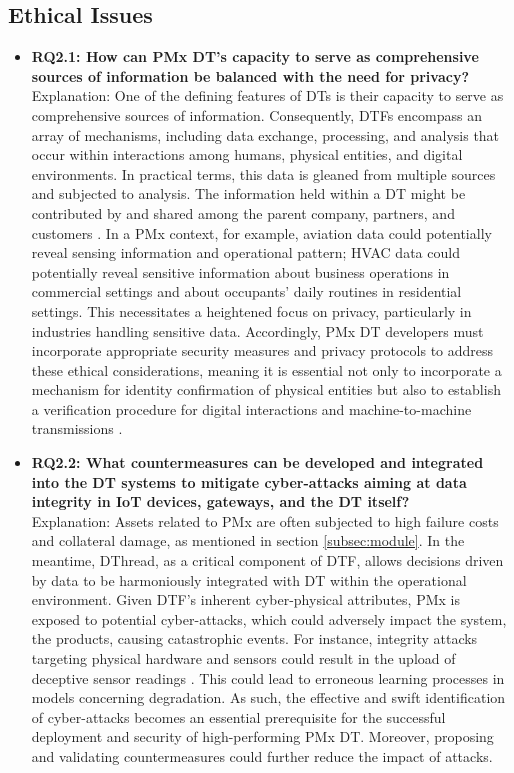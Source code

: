 \documentclass[runningheads]{llncs}
\begin{document}
\subsection{Ethical Issues} \label{Privary}
\begin{itemize}
\item \textbf{RQ2.1: How can PMx DT's capacity to serve as comprehensive sources of information be balanced with the need for privacy?} \\
Explanation: One of the defining features of DTs is their capacity to serve as comprehensive sources of information. Consequently, DTFs encompass an array of mechanisms, including data exchange, processing, and analysis that occur within interactions among humans, physical entities, and digital environments. In practical terms, this data is gleaned from multiple sources and subjected to analysis. The information held within a DT might be contributed by and shared among the parent company, partners, and customers \cite{moshrefzadeh2020towards}. In a PMx context, for example, aviation data could potentially reveal sensing information and operational pattern; HVAC data could potentially reveal sensitive information about business operations in commercial settings and about occupants' daily routines in residential settings. This necessitates a heightened focus on privacy, particularly in industries handling sensitive data. Accordingly, PMx DT developers must incorporate appropriate security measures and privacy protocols to address these ethical considerations, meaning it is essential not only to incorporate a mechanism for identity confirmation of physical entities but also to establish a verification procedure for digital interactions and machine-to-machine transmissions \cite{qian2022privacy}.

\item \textbf{RQ2.2: What countermeasures can be developed and integrated into the DT systems to mitigate cyber-attacks aiming at data integrity in IoT devices, gateways, and the DT itself?} \\
Explanation: Assets related to PMx are often subjected to high failure costs and collateral damage, as mentioned in section \ref{subsec:module}. In the meantime, DThread, as a critical component of DTF, allows decisions driven by data to be harmoniously integrated with DT within the operational environment. Given DTF's inherent cyber-physical attributes, PMx is exposed to potential cyber-attacks, which could adversely impact the system, the products, causing catastrophic events. For instance, integrity attacks targeting physical hardware and sensors could result in the upload of deceptive sensor readings \cite{qian2022privacy}. This could lead to erroneous learning processes in models concerning degradation. As such, the effective and swift identification of cyber-attacks becomes an essential prerequisite for the successful deployment and security of high-performing PMx DT. Moreover, proposing and validating countermeasures could further reduce the impact of attacks.

\end{itemize}
\end{document}
